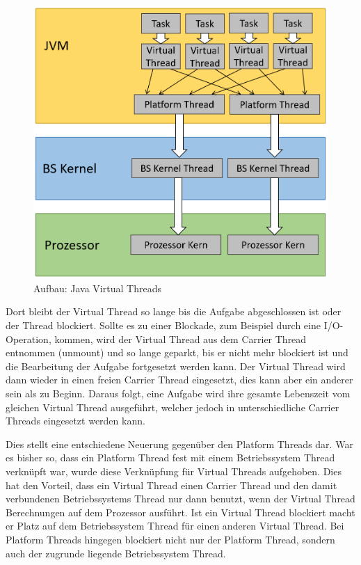\documentclass[fontsize=12pt,paper=a4,twoside=semi,parskip=half-,headsepline,headinclude]{scrreprt}
\begin{document}
\begin{figure}[h]
	\centering
	\includegraphics[scale=0.5]{figures/VirtualThreads.png}
	\caption{Aufbau: Java Virtual Threads}
	\label{fig:VirtualThreads}
\end{figure}

Dort bleibt der Virtual Thread so lange bis die Aufgabe abgeschlossen ist oder der Thread blockiert. Sollte es zu einer Blockade, zum Beispiel durch eine I/O-Operation, kommen, wird der Virtual Thread aus dem Carrier Thread entnommen (unmount) und so lange geparkt, bis er nicht mehr blockiert ist und die Bearbeitung der Aufgabe fortgesetzt werden kann. Der Virtual Thread wird dann wieder in einen freien Carrier Thread eingesetzt, dies kann aber ein anderer sein als zu Beginn. Daraus folgt, eine Aufgabe wird ihre gesamte Lebenszeit vom gleichen Virtual Thread ausgeführt, welcher jedoch in unterschiedliche Carrier Threads eingesetzt werden kann. 

Dies stellt eine entschiedene Neuerung gegenüber den Platform Threads dar. War es bisher so, dass ein Platform Thread fest mit einem Betriebssystem Thread verknüpft war, wurde diese Verknüpfung für Virtual Threads aufgehoben. Dies hat den Vorteil, dass ein Virtual Thread einen Carrier Thread und den damit verbundenen Betriebssystems Thread nur dann benutzt, wenn der Virtual Thread Berechnungen auf dem Prozessor ausführt. Ist ein Virtual Thread blockiert macht er Platz auf dem Betriebssystem Thread für einen anderen Virtual Thread. Bei Platform Threads hingegen blockiert nicht nur der Platform Thread, sondern auch der zugrunde liegende Betriebssystem Thread. \cite{Bateman2023}
\end{document}
